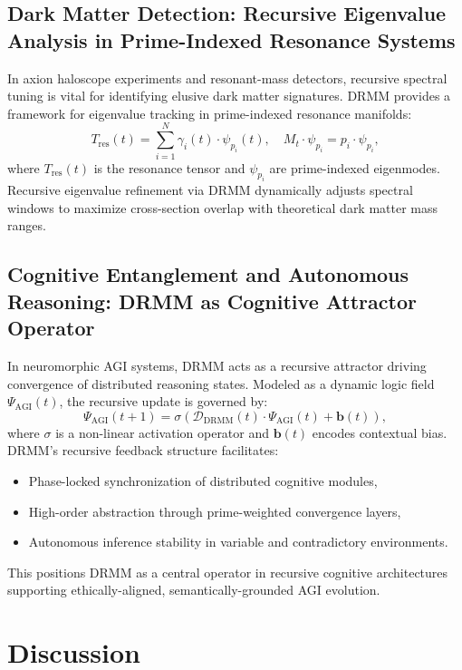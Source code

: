 \documentclass{article}
\theoremstyle{plain}
\begin{document}
\subsection{Dark Matter Detection: Recursive Eigenvalue Analysis in Prime-Indexed Resonance Systems}

In axion haloscope experiments and resonant-mass detectors, recursive spectral tuning is vital for identifying elusive dark matter signatures. DRMM provides a framework for eigenvalue tracking in prime-indexed resonance manifolds:
\begin{equation}
T_{\text{res}}(t) = \sum_{i=1}^N \gamma_i(t) \cdot \psi_{p_i}(t), \quad M_t \cdot \psi_{p_i} = p_i \cdot \psi_{p_i},
\end{equation}
where $T_{\text{res}}(t)$ is the resonance tensor and $\psi_{p_i}$ are prime-indexed eigenmodes. Recursive eigenvalue refinement via DRMM dynamically adjusts spectral windows to maximize cross-section overlap with theoretical dark matter mass ranges.

\subsection{Cognitive Entanglement and Autonomous Reasoning: DRMM as Cognitive Attractor Operator}

In neuromorphic AGI systems, DRMM acts as a recursive attractor driving convergence of distributed reasoning states. Modeled as a dynamic logic field $\Psi_{\text{AGI}}(t)$, the recursive update is governed by:
\begin{equation}
\Psi_{\text{AGI}}(t+1) = \sigma \left( \mathcal{D}_{\text{DRMM}}(t) \cdot \Psi_{\text{AGI}}(t) + \mathbf{b}(t) \right),
\end{equation}
where $\sigma$ is a non-linear activation operator and $\mathbf{b}(t)$ encodes contextual bias. DRMM's recursive feedback structure facilitates:
\begin{itemize}
    \item Phase-locked synchronization of distributed cognitive modules,
    \item High-order abstraction through prime-weighted convergence layers,
    \item Autonomous inference stability in variable and contradictory environments.
\end{itemize}
This positions DRMM as a central operator in recursive cognitive architectures supporting ethically-aligned, semantically-grounded AGI evolution.

\section{Discussion}
\end{document}
